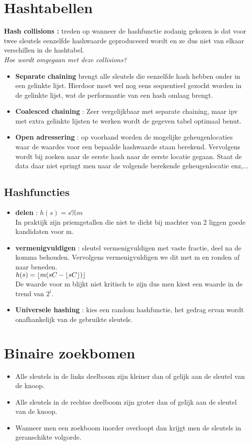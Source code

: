 \documentclass[11pt]{article}
\DeclarePairedDelimiter\floor{\lfloor}{\rfloor}
\begin{document}
\section{Hashtabellen}
\textbf{Hash collisions :} treden op wanneer de hashfunctie zodanig gekozen is dat voor twee sleutels eenzelfde hashwaarde geproduceerd wordt en ze dus niet van elkaar verschillen in de hashtabel. \\
\emph{Hoe wordt omgegaan met deze collisions?}
\begin{itemize}
	\item \textbf{Separate chaining} brengt alle sleutels die eenzelfde hash hebben onder in een gelinkte lijst. Hierdoor moet wel nog eens sequentieel gezocht worden in de gelinkte lijst, wat de performantie van een hash omlaag brengt.
	\item \textbf{Coalesced chaining} : Zeer vergelijkbaar met separate chaining, maar ipv met extra gelinkte lijsten te werken wordt de gegeven tabel optimaal benut.
	\item \textbf{Open adressering} : op voorhand worden de mogelijke geheugenlocaties waar de waardes voor een bepaalde hashwaarde staan berekend. Vervolgens wordt bij zoeken naar de eerste hash naar de eerste locatie gegaan. Staat de data daar niet springt men naar de volgende berekende geheugenlocatie enz,...
\end{itemize}
\subsection{Hashfuncties}
\begin{itemize}
	\item \textbf{delen} : $h(s) = s \% m$ \\
		In praktijk zijn priemgetallen die niet te dicht bij machter van 2 liggen goede kandidaten voor m.
	\item \textbf{vermenigvuldigen} : sleutel vermenigvuldigen met vaste fractie, deel na de komma behouden. Vervolgens vermenigvuldigen we dit met m en ronden af naar beneden. \\
			$ h(s) = \floor{m(sC - \floor{sC})}$ \\
			De waarde voor m blijkt niet kritisch te zijn dus men kiest een waarde in de trend van $2^i$.
	\item \textbf{Universele hashing} : kies een random hashfunctie, het gedrag ervan wordt onafhankelijk van de gebruikte sleutels.
\end{itemize}
\section{Binaire zoekbomen}
\begin{itemize}
	\item Alle sleutels in de links deelboom zijn kleiner dan of gelijk aan de sleutel van de knoop.
	\item Alle sleutels in de rechtse deelboom zijn groter dan of gelijk aan de sleutel van de knoop.
	\item Wanneer men een zoekboom inorder overloopt dan krijgt men de sleutels in geranschikte volgorde.
\end{itemize}
\end{document}
